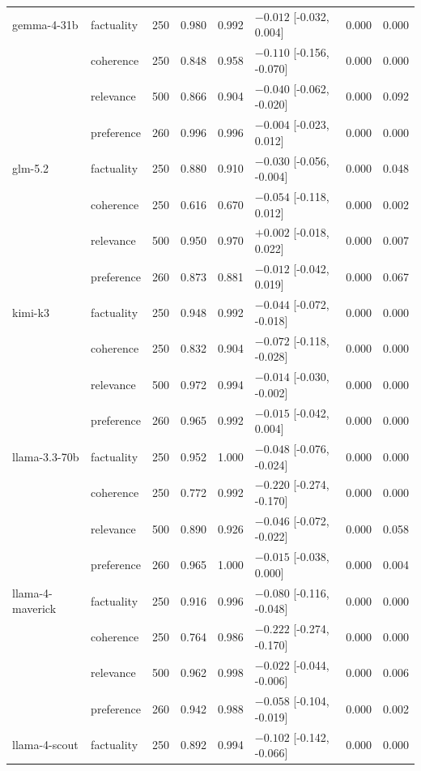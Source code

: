 \begin{table}[t]
\begin{tabular}{llrrrlrr}
gemma-4-31b & factuality & 250 & 0.980 & 0.992 & $-0.012$ [-0.032, 0.004] & 0.000 & 0.000 \\
 & coherence & 250 & 0.848 & 0.958 & $-0.110$ [-0.156, -0.070] & 0.000 & 0.000 \\
 & relevance & 500 & 0.866 & 0.904 & $-0.040$ [-0.062, -0.020] & 0.000 & 0.092 \\
 & preference & 260 & 0.996 & 0.996 & $-0.004$ [-0.023, 0.012] & 0.000 & 0.000 \\
\addlinespace
glm-5.2 & factuality & 250 & 0.880 & 0.910 & $-0.030$ [-0.056, -0.004] & 0.000 & 0.048 \\
 & coherence & 250 & 0.616 & 0.670 & $-0.054$ [-0.118, 0.012] & 0.000 & 0.002 \\
 & relevance & 500 & 0.950 & 0.970 & $+0.002$ [-0.018, 0.022] & 0.000 & 0.007 \\
 & preference & 260 & 0.873 & 0.881 & $-0.012$ [-0.042, 0.019] & 0.000 & 0.067 \\
\addlinespace
kimi-k3 & factuality & 250 & 0.948 & 0.992 & $-0.044$ [-0.072, -0.018] & 0.000 & 0.000 \\
 & coherence & 250 & 0.832 & 0.904 & $-0.072$ [-0.118, -0.028] & 0.000 & 0.000 \\
 & relevance & 500 & 0.972 & 0.994 & $-0.014$ [-0.030, -0.002] & 0.000 & 0.000 \\
 & preference & 260 & 0.965 & 0.992 & $-0.015$ [-0.042, 0.004] & 0.000 & 0.000 \\
\addlinespace
llama-3.3-70b & factuality & 250 & 0.952 & 1.000 & $-0.048$ [-0.076, -0.024] & 0.000 & 0.000 \\
 & coherence & 250 & 0.772 & 0.992 & $-0.220$ [-0.274, -0.170] & 0.000 & 0.000 \\
 & relevance & 500 & 0.890 & 0.926 & $-0.046$ [-0.072, -0.022] & 0.000 & 0.058 \\
 & preference & 260 & 0.965 & 1.000 & $-0.015$ [-0.038, 0.000] & 0.000 & 0.004 \\
\addlinespace
llama-4-maverick & factuality & 250 & 0.916 & 0.996 & $-0.080$ [-0.116, -0.048] & 0.000 & 0.000 \\
 & coherence & 250 & 0.764 & 0.986 & $-0.222$ [-0.274, -0.170] & 0.000 & 0.000 \\
 & relevance & 500 & 0.962 & 0.998 & $-0.022$ [-0.044, -0.006] & 0.000 & 0.006 \\
 & preference & 260 & 0.942 & 0.988 & $-0.058$ [-0.104, -0.019] & 0.000 & 0.002 \\
\addlinespace
llama-4-scout & factuality & 250 & 0.892 & 0.994 & $-0.102$ [-0.142, -0.066] & 0.000 & 0.000 \\

\end{tabular}
\end{table}
